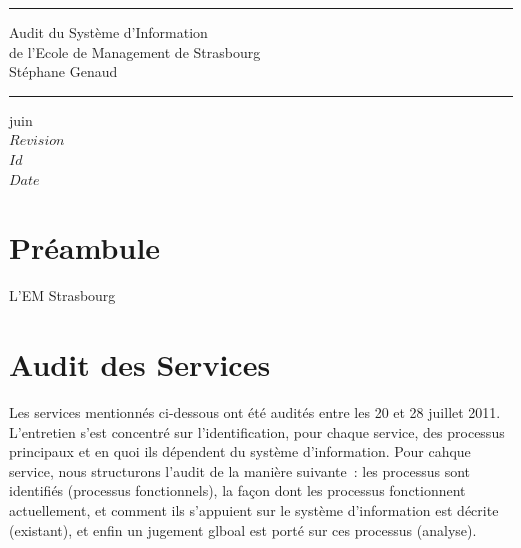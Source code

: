 \documentclass{book}
\begin{document}
\newcommand{\motcle}[1]{\index{#1}{#1}}
\newcommand{\clecommun}{stockage partagé en réseau\xspace}
\newcommand{\sre}{service relations entreprises\xspace}
\newcommand{\srh}{service ressources humaines\xspace}
\newcommand{\sop}{service organisation et process\xspace}
\newcommand{\scom}{service communication\xspace}
\newcommand{\sconc}{service concours\xspace}
\newcommand{\sintl}{service international\xspace}
\newcommand{\CK}{Christos Karacostas\xspace}


\thispagestyle{empty}
\rhead[]{}
\pagestyle{fancy}
\setlength{\parindent}{0mm}
\setlength{\parskip}{0mm}
\rule{\linewidth}{1mm}
\begin{center}
\Large{Audit du Système d'Information}\\[5mm]
\Large{de l'Ecole de Management de Strasbourg}\\[5mm]
\large{Stéphane Genaud}
\rule{\linewidth}{1mm}
\end{center}
\begin{center}
juin  \\
\textrm{
$Revision$\\
$Id$\\
$Date$\\
}
\end{center}

\tableofcontents
\newpage


\chapter*{Préambule}

L'EM Strasbourg 
 

\chapter{Audit des Services}
 
Les services mentionnés ci-dessous ont été audités entre les 20 et 28 juillet 2011.
L'entretien s'est concentré sur l'identification, pour chaque service, des processus 
principaux et en quoi ils dépendent du système d'information. Pour cahque service,
nous structurons l'audit de la manière suivante~: les processus sont identifiés
(processus fonctionnels), la façon dont les processus fonctionnent actuellement, 
et comment ils s'appuient sur le système d'information est décrite (existant), 
et enfin un jugement glboal est porté sur ces processus (analyse).
\end{document}
